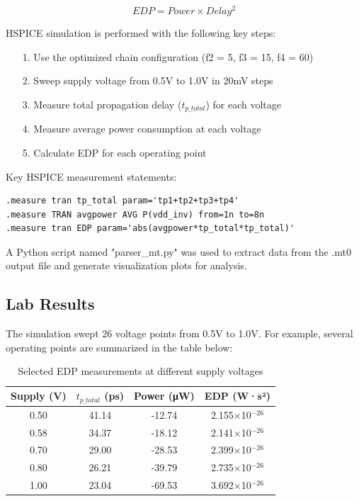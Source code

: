 \documentclass[UTF8,12pt,a4paper]{ctexart}
\begin{document}
\[EDP = Power \times Delay^2\]

HSPICE simulation is performed with the following key steps:

\begin{enumerate}
    \item[1. ] Use the optimized chain configuration (f2 = 5, f3 = 15, f4 = 60)
    \item[2. ] Sweep supply voltage from 0.5V to 1.0V in 20mV steps
    \item[3. ] Measure total propagation delay ($t_{p\_total}$) for each voltage
    \item[4. ] Measure average power consumption at each voltage
    \item[5. ] Calculate EDP for each operating point
\end{enumerate}

Key HSPICE measurement statements:

\begin{lstlisting}
.measure tran tp_total param='tp1+tp2+tp3+tp4'
.measure TRAN avgpower AVG P(vdd_inv) from=1n to=8n
.measure tran EDP param='abs(avgpower*tp_total*tp_total)'
\end{lstlisting}

A Python script named "parser\_mt.py" was used to extract data from the .mt0 output file and generate visualization plots for analysis.

\subsection{Lab Results}

The simulation swept 26 voltage points from 0.5V to 1.0V. For example, several operating points are summarized in the table below:

\begin{table}[h]
\centering
\begin{tabular}{cccc}
\toprule
\textbf{Supply (V)} & \textbf{$t_{p\_total}$ (ps)} & \textbf{Power (μW)} & \textbf{EDP (W·s²)} \\
\midrule
0.50 & 41.14 & -12.74 & 2.155×10$^{-26}$ \\
0.58 & 34.37 & -18.12 & 2.141×10$^{-26}$ \\
0.70 & 29.00 & -28.53 & 2.399×10$^{-26}$ \\
0.80 & 26.21 & -39.79 & 2.735×10$^{-26}$ \\
1.00 & 23.04 & -69.53 & 3.692×10$^{-26}$ \\
\bottomrule
\end{tabular}
\caption{Selected EDP measurements at different supply voltages}
\end{table}
\end{document}
